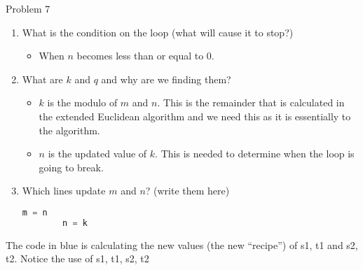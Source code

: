 \begin{problem}{Problem 7}
\begin{highlight}[Solution]
        \begin{enumerate}[start = 4]
            \item What is the condition on the loop (what will cause it to stop?)
            \begin{itemize}
                \item When $n$ becomes less than or equal to 0.
            \end{itemize}
            \item What are $k$ and $q$ and why are we finding them?
            \begin{itemize}
                \item $k$ is the modulo of $m$ and $n$. This is the remainder that is calculated in the extended Euclidean algorithm and we need this as it is essentially to the algorithm.
                \item $n$ is the updated value of $k$. This is needed to determine when the loop is going to break.
            \end{itemize}
            \item Which lines update $m$ and $n$? (write them here)
    \begin{lstlisting}[style=stackoverflow, language=python]
        m = n
        n = k
    \end{lstlisting}
        \end{enumerate}
        The code in blue is calculating the new values (the new “recipe”) of s1, t1 and s2, t2. Notice the use of s1, t1, s2, t2


\end{highlight}
\end{problem}
